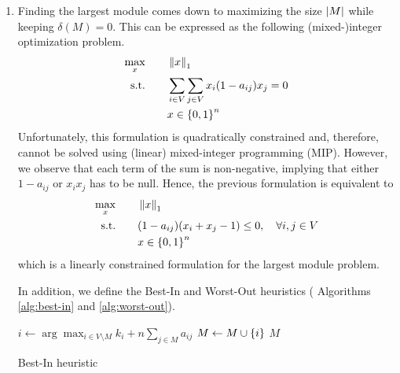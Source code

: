 \documentclass[a4paper, 12pt]{article}
\begin{document}
    \begin{enumerate}[leftmargin=*]
        \item Finding the largest module comes down to maximizing the size $\left|M\right|$ while keeping $\delta(M) = 0$. This can be expressed as the following (mixed-)integer optimization problem.
        \begin{alignat*}{3}
            \max_x && \quad & \left\|x\right\|_1 \\
            \text{s.t.} &&& \sum_{i \in V} \sum_{j \in V} x_i (1 - a_{ij}) x_j = 0 \\
            &&& x \in \left\{0, 1\right\}^n 
        \end{alignat*}
        Unfortunately, this formulation is quadratically constrained and, therefore, cannot be solved using (linear) mixed-integer programming (MIP). However, we observe that each term of the sum is non-negative, implying that either $1 - a_{ij}$ or $x_i x_j$ has to be null. Hence, the previous formulation is equivalent to
        \begin{alignat*}{3}
            \max_x && \quad & \left\|x\right\|_1 \\
            \text{s.t.} &&& (1 - a_{ij}) (x_i + x_j - 1) \leq 0, \quad \forall i, j \in V \\
            &&& x \in \left\{0, 1\right\}^n
        \end{alignat*}
        which is a linearly constrained formulation for the largest module problem.
        
        In addition, we define the Best-In and Worst-Out heuristics (\cf{} Algorithms \ref{alg:best-in} and \ref{alg:worst-out}).
        
        \begin{algorithm}[h]
            \begin{algorithmic}[1]
    				 
    					\State $i \gets \arg\max_{i \in V \setminus M} k_i + n \sum_{j \in M} a_{ij}$ 
    					 
    					    \State $M \gets M \cup \left\{i\right\}$ 
    					\Else{} \Break
    					\EndIf
    				\EndWhile
    				\State \Return $M$
    			\EndFunction
    		\end{algorithmic}
    		\caption{Best-In heuristic}
		    \label{alg:best-in}
		\end{algorithm}
		
		\vspace{-1em}
        

\end{enumerate}
\end{document}
